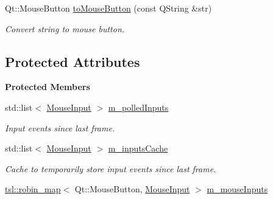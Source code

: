 \begin{Indent}
\begin{DoxyCompactItemize}
\mbox{\label{classrev_1_1_mouse_handler_abd865b32c0347aeb83df18fa5c301d3d}} 
Qt\+::\+Mouse\+Button \mbox{\hyperlink{classrev_1_1_mouse_handler_abd865b32c0347aeb83df18fa5c301d3d}{to\+Mouse\+Button}} (const Q\+String \&str)
\begin{DoxyCompactList}\small\item\em Convert string to mouse button. \end{DoxyCompactList}\end{DoxyCompactItemize}
\end{Indent}
\subsection*{Protected Attributes}
\begin{Indent}\textbf{ Protected Members}\par
\begin{DoxyCompactItemize}
\item 
\mbox{\label{classrev_1_1_mouse_handler_a86bd484ca2aae7e5c292f05dc3faa950}} 
std\+::list$<$ \mbox{\hyperlink{structrev_1_1_mouse_input}{Mouse\+Input}} $>$ \mbox{\hyperlink{classrev_1_1_mouse_handler_a86bd484ca2aae7e5c292f05dc3faa950}{m\+\_\+polled\+Inputs}}
\begin{DoxyCompactList}\small\item\em Input events since last frame. \end{DoxyCompactList}\item 
\mbox{\label{classrev_1_1_mouse_handler_a5b3e364a736a932a6b9d5bd63b4ad6eb}} 
std\+::list$<$ \mbox{\hyperlink{structrev_1_1_mouse_input}{Mouse\+Input}} $>$ \mbox{\hyperlink{classrev_1_1_mouse_handler_a5b3e364a736a932a6b9d5bd63b4ad6eb}{m\+\_\+inputs\+Cache}}
\begin{DoxyCompactList}\small\item\em Cache to temporarily store input events since last frame. \end{DoxyCompactList}\item 
\mbox{\label{classrev_1_1_mouse_handler_abe99783ed98f390844a6cd9a276845ca}} 
\mbox{\hyperlink{classtsl_1_1robin__map}{tsl\+::robin\+\_\+map}}$<$ Qt\+::\+Mouse\+Button, \mbox{\hyperlink{structrev_1_1_mouse_input}{Mouse\+Input}} $>$ \mbox{\hyperlink{classrev_1_1_mouse_handler_abe99783ed98f390844a6cd9a276845ca}{m\+\_\+mouse\+Inputs}}

\end{DoxyCompactItemize}
\end{Indent}

